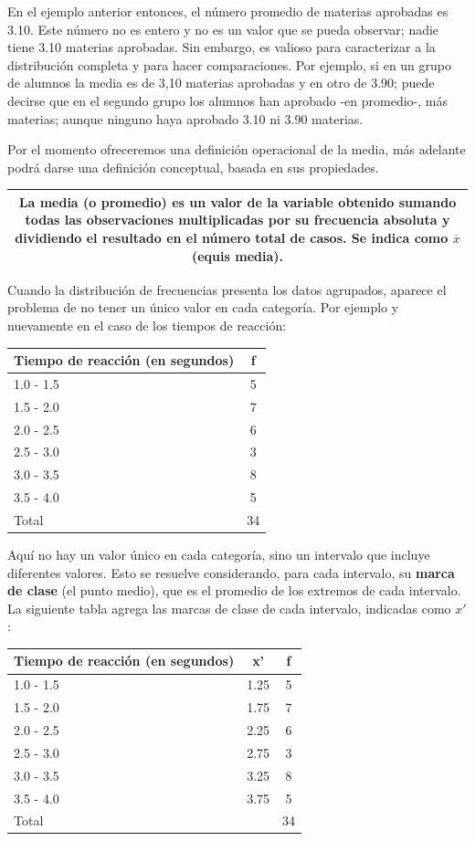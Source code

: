 \documentclass[]{book}
\begin{document}
En el ejemplo anterior entonces, el número promedio de materias
aprobadas es 3.10. Este número no es entero y no es un valor que se
pueda observar; nadie tiene 3.10 materias aprobadas. Sin embargo, es
valioso para caracterizar a la distribución completa y para hacer
comparaciones. Por ejemplo, si en un grupo de alumnos la media es de
3,10 materias aprobadas y en otro de 3.90; puede decirse que en el
segundo grupo los alumnos han aprobado -en promedio-, más materias;
aunque ninguno haya aprobado 3.10 ni 3.90 materias.

Por el momento ofreceremos una definición operacional de la media, más
adelante podrá darse una definición conceptual, basada en sus
propiedades.

\begin{longtable}[]{@{}c@{}}
\toprule
\endhead
\begin{minipage}[t]{0.97\columnwidth}\centering
La \textbf{media} (o promedio) es un valor de la variable obtenido sumando todas las observaciones multiplicadas por su frecuencia absoluta y dividiendo el resultado en el número total de casos. Se indica como \(\overline{x}\) (equis media).\strut
\end{minipage}\tabularnewline
\bottomrule
\end{longtable}

Cuando la distribución de frecuencias presenta los datos agrupados,
aparece el problema de no tener un único valor en cada categoría. Por
ejemplo y nuevamente en el caso de los tiempos de reacción:

\begin{longtable}[]{@{}lc@{}}
\toprule
Tiempo de reacción (en segundos) & f\tabularnewline
\midrule
\endhead
1.0 - 1.5 & 5\tabularnewline
1.5 - 2.0 & 7\tabularnewline
2.0 - 2.5 & 6\tabularnewline
2.5 - 3.0 & 3\tabularnewline
3.0 - 3.5 & 8\tabularnewline
3.5 - 4.0 & 5\tabularnewline
Total & 34\tabularnewline
\bottomrule
\end{longtable}

Aquí no hay un valor único en cada categoría, sino un intervalo que
incluye diferentes valores. Esto se resuelve considerando, para cada
intervalo, su \textbf{marca de clase} (el punto medio), que es el promedio de
los extremos de cada intervalo. La siguiente tabla agrega las marcas de
clase de cada intervalo, indicadas como \(x'\):

\begin{longtable}[]{@{}lcc@{}}
\toprule
Tiempo de reacción (en segundos) & x' & f\tabularnewline
\midrule
\endhead
1.0 - 1.5 & 1.25 & 5\tabularnewline
1.5 - 2.0 & 1.75 & 7\tabularnewline
2.0 - 2.5 & 2.25 & 6\tabularnewline
2.5 - 3.0 & 2.75 & 3\tabularnewline
3.0 - 3.5 & 3.25 & 8\tabularnewline
3.5 - 4.0 & 3.75 & 5\tabularnewline
Total & & 34\tabularnewline
\bottomrule
\end{longtable}
\end{document}
